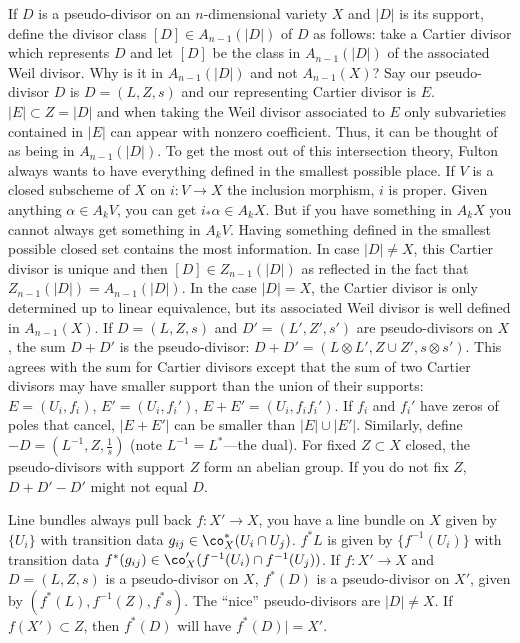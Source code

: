 If $D$ is a pseudo-divisor on an $n$-dimensional variety $X$ and $|D|$ is its support, define the divisor class $[D] \in A_{n-1}(|D|)$ of $D$ as follows: take a Cartier divisor which represents $D$ and let $[D]$ be the class in $A_{n-1}(|D|)$ of the associated Weil divisor. Why is it in $A_{n-1}(|D|)$ and not $A_{n-1}(X)$? Say our pseudo-divisor $D$ is $D=(L,Z,s)$ and our representing Cartier divisor is $E$. $|E| \subset Z =|D|$ and when taking the Weil divisor associated to $E$ only subvarieties contained in $|E|$ can appear with nonzero coefficient. Thus, it can be thought of as being in $A_{n-1}(|D|)$. To get the most out of this intersection theory, Fulton always wants to have everything defined in the smallest possible place. If $V$ is a closed subscheme of $X$ on $i: V \to X$ the inclusion morphism, $i$ is proper. Given anything $\alpha \in A_kV$, you can get $i_*\alpha \in A_kX$. But if you have something in $A_kX$ you cannot always get something in $A_kV$. Having something defined in the smallest possible closed set contains the most information. In case $|D| \neq X$, this Cartier divisor is unique and then $[D] \in Z_{n-1}(|D|)$ as reflected in the fact that $Z_{n-1}(|D|)=A_{n-1}(|D|)$. In the case $|D|=X$, the Cartier divisor is only determined up to linear equivalence, but its associated Weil divisor is well defined in $A_{n-1}(X)$. If $D=(L,Z,s)$ and $D'=(L',Z',s')$ are pseudo-divisors on $X$, the sum $D+D'$ is the pseudo-divisor: $D+D'=(L \otimes L', Z \cup Z', s \otimes s')$. This agrees with the sum for Cartier divisors except that the sum of two Cartier divisors may have smaller support than the union of their supports: $E=(U_i,f_i)$, $E'=(U_i,f_i')$, $E+E'=(U_i,f_if_i')$. If $f_i$ and $f_i'$ have zeros of poles that cancel, $|E+E'|$ can be smaller than $|E| \cup |E'|$. Similarly, define $-D= (L^{-1},Z,\frac{1}{s})$ (note $L^{-1}=L^*$---the dual). For fixed $Z \subset X$ closed, the pseudo-divisors with support $Z$ form an abelian group. If you do not fix $Z$, $D+D'-D'$ might not equal $D$.

\begin{dfn}

\end{dfn}


Line bundles always pull back $f: X' \to X$, you have a line bundle on $X$ given by $\{U_i\}$ with transition data $g_{ij} \in \co_X^*(U_i \cap U_j)$. $f^*L$ is given by $\{f^{-1}(U_i)\}$ with transition data $f^*(g_{ij}) \in \co_X'(f^{-1}(U_i) \cap f^{-1}(U_j))$. If $f: X' \to X$ and $D=(L,Z,s)$ is a pseudo-divisor on $X$, $f^*(D)$ is a pseudo-divisor on $X'$, given by $(f^*(L),f^{-1}(Z),f^*s)$. The ``nice'' pseudo-divisors are $|D| \neq X$. If $f(X') \subset Z$, then $f^*(D)$ will have $f^*(D)|=X'$. 


